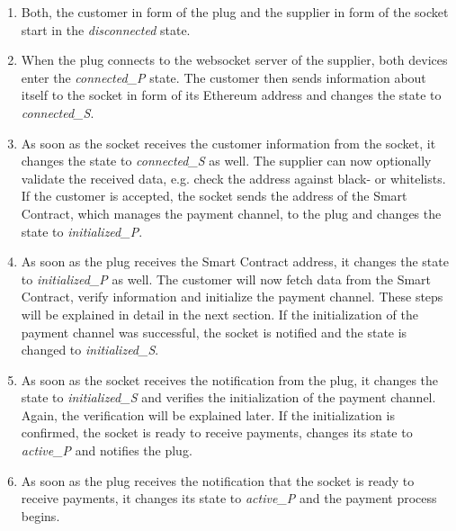 \begin{enumerate}[start=0, label=\arabic*:]
\item Both, the customer in form of the plug and the supplier in form of the socket start in the \textit{disconnected} state. 
  \item When the plug connects to the websocket server of the supplier, both devices enter the \textit{connected\_P} state. The customer then sends information about itself to the socket in form of its Ethereum address and changes the state to \textit{connected\_S}.
  \item As soon as the socket receives the customer information from the socket, it changes the state to \textit{connected\_S} as well. The supplier can now optionally validate the received data, e.g. check the address against black- or whitelists. If the customer is accepted, the socket sends the address of the Smart Contract, which manages the payment channel, to the plug and changes the state to \textit{initialized\_P}.
  \item As soon as the plug receives the Smart Contract address, it changes the state to \textit{initialized\_P} as well. The customer will now fetch data from the Smart Contract, verify information and initialize the payment channel. These steps will be explained in detail in the next section. If the initialization of the payment channel was successful, the socket is notified and the state is changed to \textit{initialized\_S}.
  \item As soon as the socket receives the notification from the plug, it changes the state to \textit{initialized\_S} and verifies the initialization of the payment channel. Again, the verification will be explained later. If the initialization is confirmed, the socket is ready to receive payments, changes its state to \textit{active\_P} and notifies the plug.
  \item As soon as the plug receives the notification that the socket is ready to receive payments, it changes its state to \textit{active\_P} and the payment process begins.
\end{enumerate}
\leavevmode
\\
